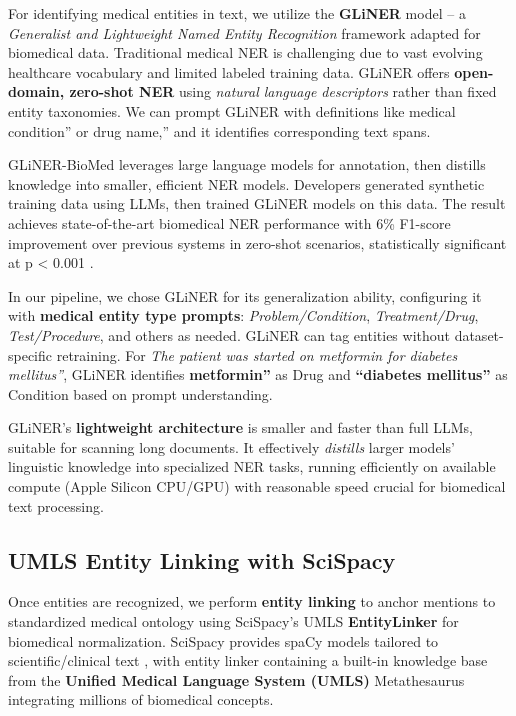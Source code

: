 For identifying medical entities in text, we utilize the \textbf{GLiNER} model – a \textit{Generalist and Lightweight Named Entity Recognition} framework adapted for biomedical data. Traditional medical NER is challenging due to vast evolving healthcare vocabulary and limited labeled training data. GLiNER offers \textbf{open-domain, zero-shot NER} using \textit{natural language descriptors} rather than fixed entity taxonomies. We can prompt GLiNER with definitions like medical condition'' or drug name,'' and it identifies corresponding text spans.

GLiNER-BioMed leverages large language models for annotation, then distills knowledge into smaller, efficient NER models. Developers generated synthetic training data using LLMs, then trained GLiNER models on this data. The result achieves state-of-the-art biomedical NER performance with 6\% F1-score improvement over previous systems in zero-shot scenarios, statistically significant at p < 0.001 \parencite{Stenetorp2024}.

In our pipeline, we chose GLiNER for its generalization ability, configuring it with \textbf{medical entity type prompts}: \textit{Problem/Condition}, \textit{Treatment/Drug}, \textit{Test/Procedure}, and others as needed. GLiNER can tag entities without dataset-specific retraining. For \textit{The patient was started on metformin for diabetes mellitus''}, GLiNER identifies \textbf{metformin''} as Drug and \textbf{``diabetes mellitus''} as Condition based on prompt understanding.

GLiNER's \textbf{lightweight architecture} is smaller and faster than full LLMs, suitable for scanning long documents. It effectively \textit{distills} larger models' linguistic knowledge into specialized NER tasks, running efficiently on available compute (Apple Silicon CPU/GPU) with reasonable speed crucial for biomedical text processing.

\subsection{UMLS Entity Linking with SciSpacy}
\label{sec:entitylinking}

Once entities are recognized, we perform \textbf{entity linking} to anchor mentions to standardized medical ontology using SciSpacy's UMLS \textbf{EntityLinker} for biomedical normalization. SciSpacy provides spaCy models tailored to scientific/clinical text \parencite{Neumann2019}, with entity linker containing a built-in knowledge base from the \textbf{Unified Medical Language System (UMLS)} Metathesaurus integrating millions of biomedical concepts.

